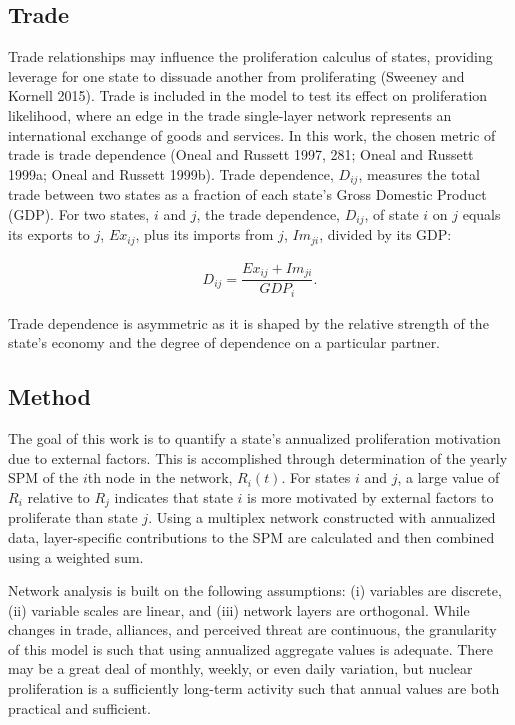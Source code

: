 \documentclass{article} %
\begin{document}
{\subsection{Trade}

Trade relationships may influence the proliferation calculus of states, providing leverage for one state to dissuade another from proliferating (Sweeney and Kornell 2015). Trade is included in the model to test its effect on proliferation likelihood, where an edge in the trade single-layer network represents an international exchange of goods and services. In this work, the chosen metric of trade is trade dependence (Oneal and Russett 1997, 281; Oneal and Russett 1999a; Oneal and Russett 1999b). Trade dependence, $D_{ij}$, measures the total trade between two states as a fraction of each state's Gross Domestic Product (GDP). For two states, $i$ and $j$, the trade dependence, $D_{ij}$, of state $i$ on $j$ equals its exports to $j$, $Ex_{ij}$, plus its imports from $j$, $Im_{ji}$, divided by its GDP:
\begin{center}
\begin{equation}
\begin{aligned}
D_{ij} = \dfrac {Ex_{ij} + Im_{ji}} {GDP_i}.
\end{aligned}
\end{equation}
\end{center}
Trade dependence is asymmetric as it is shaped by the relative strength of the state's economy and the degree of dependence on a particular partner.

\subsection{Method}

The goal of this work is to quantify a state's annualized proliferation motivation due to external factors. This is accomplished through determination of the yearly SPM of the $i$th node in the network, $R_i(t)$. For states $i$ and $j$, a large value of $R_i$ relative to $R_j$ indicates that state $i$ is more motivated by external factors to proliferate than state $j$. Using a multiplex network constructed with annualized data, layer-specific contributions to the SPM are calculated and then combined using a weighted sum. 

Network analysis is built on the following assumptions: (i) variables are discrete, (ii) variable scales are linear, and (iii) network layers are orthogonal. While changes in trade, alliances, and perceived threat are continuous, the granularity of this model is such that using annualized aggregate values is adequate. There may be a great deal of monthly, weekly, or even daily variation, but nuclear proliferation is a sufficiently long-term activity such that annual values are both practical and sufficient. 

}
\end{document}
